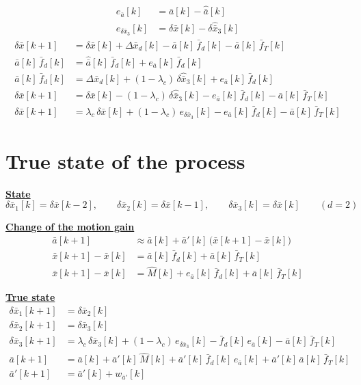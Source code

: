 \documentclass[11pt,a4paper]{ctexart}
\newcommand{\lc}{\lambda_c}
\newcommand{\bx}{\bar{x}}
\newcommand{\ba}{\bar{a}}
\newcommand{\hd}[1]{\par\bigskip\noindent\underline{\textbf{#1}}}
\begin{document}
\[
\begin{aligned}
e_{\ba}[k] &= \ba[k] - \hat{\ba}[k] \\
e_{\delta\bx_3}[k] &= \delta\bx[k] - \delta\hat{\bx}_3[k]
\end{aligned}
\]
\[
\begin{aligned}
\delta\bx[k+1] &= \delta\bx[k] + \Delta\bx_d[k] - \ba[k]\,\bar f_d[k] - \ba[k]\,\bar f_T[k] \\
\ba[k]\,\bar f_d[k] &= \hat{\ba}[k]\,\bar f_d[k] + e_{\ba}[k]\,\bar f_d[k] \\
\ba[k]\,\bar f_d[k] &= \Delta\bx_d[k] + (1-\lc)\,\delta\hat{\bx}_3[k] + e_{\ba}[k]\,\bar f_d[k] \\
\delta\bx[k+1] &= \delta\bx[k] - (1-\lc)\,\delta\hat{\bx}_3[k] - e_{\ba}[k]\,\bar f_d[k] - \ba[k]\,\bar f_T[k] \\
\delta\bx[k+1] &= \lc\,\delta\bx[k] + (1-\lc)\,e_{\delta\bx_3}[k] - e_{\ba}[k]\,\bar f_d[k] - \ba[k]\,\bar f_T[k]
\end{aligned}
\]

\section{True state of the process}

\hd{State}
\[
\delta\bx_1[k] = \delta\bx[k-2], \qquad \delta\bx_2[k] = \delta\bx[k-1], \qquad \delta\bx_3[k] = \delta\bx[k] \qquad (d = 2)
\]

\hd{Change of the motion gain}
\[
\begin{aligned}
\ba[k+1] &\approx \ba[k] + \ba'[k]\,\big(\bx[k+1] - \bx[k]\big) \\
\bx[k+1] - \bx[k] &= \ba[k]\,\bar f_d[k] + \ba[k]\,\bar f_T[k] \\
\bx[k+1] - \bx[k] &= \hat{M}[k] + e_{\ba}[k]\,\bar f_d[k] + \ba[k]\,\bar f_T[k]
\end{aligned}
\]

\hd{True state}
\[
\begin{aligned}
\delta\bx_1[k+1] &= \delta\bx_2[k] \\
\delta\bx_2[k+1] &= \delta\bx_3[k] \\
\delta\bx_3[k+1] &= \lc\,\delta\bx_3[k] + (1-\lc)\,e_{\delta\bx_3}[k] - \bar f_d[k]\,e_{\ba}[k] - \ba[k]\,\bar f_T[k] \\
\ba[k+1] &= \ba[k] + \ba'[k]\,\hat{M}[k] + \ba'[k]\,\bar f_d[k]\,e_{\ba}[k] + \ba'[k]\,\ba[k]\,\bar f_T[k] \\
\ba'[k+1] &= \ba'[k] + w_{\ba'}[k]
\end{aligned}
\]
\end{document}
